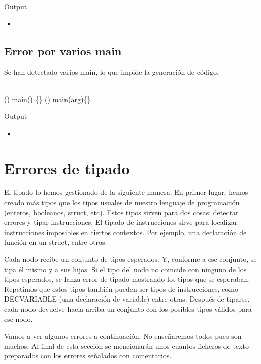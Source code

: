 Output

\begin{itemize}
	\item {}
\end{itemize}

\newpage
\subsection{Error por varios main}
Se han detectado varios main, lo que impide la generación de código.

\begin{algorithm}
	\\
	\Void () main() \{\}\;
	\Integer{}(\Integer{}) main(arg)\{\}\;
\end{algorithm}

Output

\begin{itemize}
	\item {}
\end{itemize}


\newpage
\section{Errores de tipado}

El tipado lo hemos gestionado de la siguiente manera. En primer lugar, hemos creado más tipos que los tipos usuales
de nuestro lenguaje de programación (enteros, booleanos, struct, etc). Estos tipos sirven para dos cosas: detectar errores
y tipar instrucciones. El tipado de instrucciones sirve para localizar instrucciones imposibles en ciertos contextos. Por
ejemplo, una declaración de función en un struct, entre otros.

Cada nodo recibe un conjunto de tipos esperados. Y, conforme a ese conjunto, se tipa él mismo y a sus hijos. Si el tipo del
nodo no coincide con ninguno de los tipos esperados, se lanza error de tipado mostrando los tipos que se esperaban. Repetimos
que estos tipos también pueden ser tipos de instrucciones, como DECVARIABLE (una declaración de variable) entre otras. Después 
de tiparse, cada nodo devuelve hacia arriba un conjunto con los posibles tipos válidos para ese nodo.

Vamos a ver algunos errores a continuación. No enseñaremos todos pues son muchos. Al final de esta sección se mencionarán
unos cuantos ficheros de texto preparados con los errores señalados con comentarios.
\\

